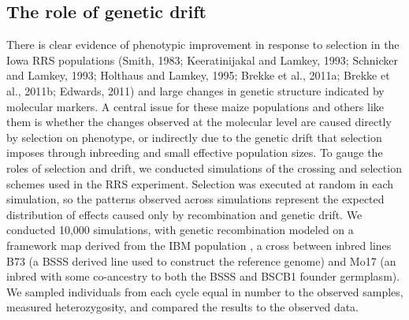
\subsection*{The role of genetic drift}
There is clear evidence of phenotypic improvement in response to selection in the Iowa RRS populations (Smith, 1983; Keeratinijakal and Lamkey, 1993; Schnicker and Lamkey, 1993; Holthaus and Lamkey, 1995; Brekke et al., 2011a; Brekke et al., 2011b; Edwards, 2011) and large changes in genetic structure indicated by molecular markers. 
A central issue for these maize populations and others like them is whether the changes observed at the molecular level are caused directly by selection on phenotype, or indirectly due to the genetic drift that selection imposes through inbreeding and small effective population sizes. 
To gauge the roles of selection and drift, we conducted simulations of the crossing and selection schemes used in the RRS experiment.
Selection was executed at random in each simulation, so the patterns observed across simulations represent the expected distribution of effects caused only by recombination and genetic drift. 
We conducted 10,000 simulations, with genetic recombination modeled on a framework map derived from the IBM population \citep{lee2002expanding}, a cross between inbred lines B73 (a BSSS derived line used to construct the reference genome) and Mo17 (an inbred with some co-ancestry to both the BSSS and BSCB1 founder germplasm). 
We sampled individuals from each cycle equal in number to the observed samples, measured heterozygosity, and compared the results to the observed data. 	

